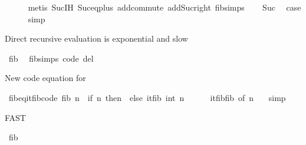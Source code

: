 \begin{isabellebody}
\ \ \ \ \isamarkupfalse%
\ {\isacharparenleft}{\kern0pt}metis\ Suc{\isachardot}{\kern0pt}IH\ Suc{\isacharunderscore}{\kern0pt}eq{\isacharunderscore}{\kern0pt}plus{}\ add{\isachardot}{\kern0pt}commute\ add{\isacharunderscore}{\kern0pt}Suc{\isacharunderscore}{\kern0pt}right\ fib{\isachardot}{\kern0pt}simps{\isacharparenleft}{\kern0pt}{}{\isacharparenright}{\kern0pt}{\isacharparenright}{\kern0pt}\isanewline
\ \ \isamarkupfalse%
\ Suc\ \isamarkupfalse%
\ {\isacharquery}{\kern0pt}case\isanewline
\ \ \ \ \isamarkupfalse%
\ simp\isanewline
{}\isamarkupfalse%
%
\endisatagproof
{\isafoldproof}%
%
\isadelimproof
%
\endisadelimproof
%
\begin{isamarkuptext}%
Direct recursive evaluation is exponential and slow%
\end{isamarkuptext}\isamarkuptrue%
\isamarkupfalse%
\ {\isachardoublequoteopen}fib\ {}{}{\isachardoublequoteclose}\isanewline
\isanewline
{}\isamarkupfalse%
\ fib{\isachardot}{\kern0pt}simps\ {\isacharbrackleft}{\kern0pt}code\ del{\isacharbrackright}{\kern0pt}%
\begin{isamarkuptext}%
New code equation for %
\end{isamarkuptext}\isamarkuptrue%
\isamarkupfalse%
\ fib{\isacharunderscore}{\kern0pt}eq{\isacharunderscore}{\kern0pt}itfib{\isacharbrackleft}{\kern0pt}code{\isacharbrackright}{\kern0pt}{\isacharcolon}{\kern0pt}\ {\isachardoublequoteopen}fib\ n\ {\isacharequal}{\kern0pt}\ {\isacharparenleft}{\kern0pt}if\ n{\isacharequal}{\kern0pt}{}\ then\ {}\ else\ itfib\ {\isacharparenleft}{\kern0pt}int\ n{\isacharparenright}{\kern0pt}\ {}\ {}{\isacharparenright}{\kern0pt}{\isachardoublequoteclose}\isanewline
%
\isadelimproof
\ \ %
\endisadelimproof
%
\isatagproof
{}\isamarkupfalse%
\ itfib{\isacharunderscore}{\kern0pt}fib\ {\isacharbrackleft}{\kern0pt}of\ n\ {}{\isacharbrackright}{\kern0pt}\ \isamarkupfalse%
\ simp%
\endisatagproof
{\isafoldproof}%
%
\isadelimproof
%
\endisadelimproof
%
\begin{isamarkuptext}%
FAST%
\end{isamarkuptext}\isamarkuptrue%
\isamarkupfalse%
\ {\isachardoublequoteopen}fib\ {}{}{}{\isachardoublequoteclose}\isanewline
%
\isadelimtheory
\isanewline
%
\endisadelimtheory
%
\isatagtheory
{}\isamarkupfalse%
%
\endisatagtheory
{\isafoldtheory}%
%
\isadelimtheory
%
\endisadelimtheory
%
\end{isabellebody}%
